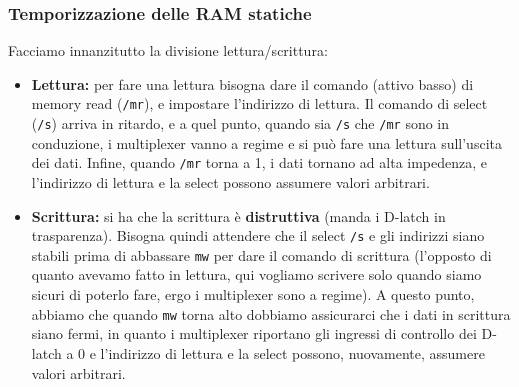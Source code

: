 \documentclass[a4paper,11pt]{article}
\begin{document}
\subsubsection{Temporizzazione delle RAM statiche}
Facciamo innanzitutto la divisione lettura/scrittura:
\begin{itemize}
	\item \textbf{Lettura:} per fare una lettura bisogna dare il comando (attivo basso) di memory read (\lstinline|/mr|), e impostare l'indirizzo di lettura.
Il comando di select (\lstinline|/s|) arriva in ritardo, e a quel punto, quando sia \lstinline|/s| che \lstinline|/mr| sono in conduzione, i multiplexer vanno a regime e si può fare una lettura sull'uscita dei dati.
Infine, quando \lstinline|/mr| torna a 1, i dati tornano ad alta impedenza, e l'indirizzo di lettura e la select possono assumere valori arbitrari.
	\item \textbf{Scrittura:} si ha che la scrittura è \textbf{distruttiva} (manda i D-latch in trasparenza). Bisogna quindi attendere che il select \lstinline|/s| e gli indirizzi siano stabili prima di abbassare \lstinline|mw| per dare il comando di scrittura (l'opposto di quanto avevamo fatto in lettura, qui vogliamo scrivere solo quando siamo sicuri di poterlo fare, ergo i multiplexer sono a regime).
		A questo punto, abbiamo che quando \lstinline|mw| torna alto dobbiamo assicurarci che i dati in scrittura siano fermi, in quanto i multiplexer riportano gli ingressi di controllo dei D-latch a 0 e l'indirizzo di lettura e la select possono, nuovamente, assumere valori arbitrari.
\end{itemize}
\end{document}
